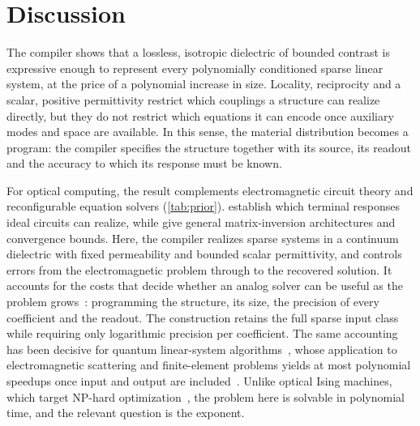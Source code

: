 \section{Discussion}

The compiler shows that a lossless, isotropic dielectric of bounded contrast is
expressive enough to represent every polynomially conditioned sparse linear
system, at the price of a polynomial increase in size. Locality, reciprocity
and a scalar, positive permittivity restrict which couplings a structure can
realize directly, but they do not restrict which equations it can encode once
auxiliary modes and space are available. In this sense, the material
distribution becomes a program: the compiler specifies the structure together
with its source, its readout and the accuracy to which its response must be
known.

For optical computing, the result complements electromagnetic circuit theory
and reconfigurable equation solvers (\cref{tab:prior}).
\citet{MiltonSeppecher2010} establish which terminal responses ideal circuits
can realize, while \citet{tzarouchis2022} give general matrix-inversion
architectures and convergence bounds. Here, the compiler realizes sparse
systems in a continuum dielectric with fixed permeability and bounded scalar
permittivity, and controls errors from the electromagnetic problem through to
the recovered solution. It accounts for the costs that decide whether an
analog solver can be useful as the problem
grows~\citep{Aaronson2015FinePrint,McMahon2023}: programming the structure,
its size, the precision of every coefficient and the readout. The construction
retains the full sparse input class while requiring only logarithmic precision
per coefficient. The same accounting has
been decisive for quantum linear-system
algorithms~\citep{HHL2009,ChildsKothariSomma2017,Aaronson2015FinePrint}, whose
application to electromagnetic scattering and finite-element problems yields at
most polynomial speedups once input and output are
included~\citep{clader2013,MontanaroPallister2016}. Unlike optical Ising
machines, which target NP-hard
optimization~\citep{Inagaki2016,Pierangeli2019,Mohseni2022}, the problem here
is solvable in polynomial time, and the relevant question is the exponent.

